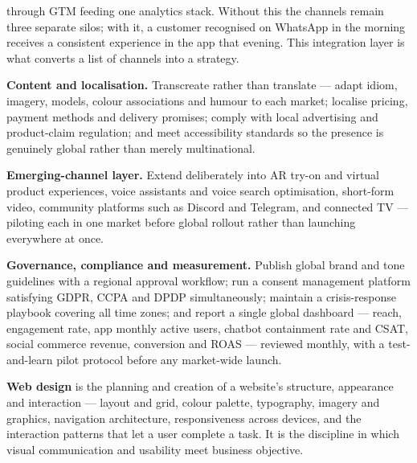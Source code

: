 \begin{qlist}
\begin{apts}
      through GTM feeding one analytics stack. Without this the channels remain
      three separate silos; with it, a customer recognised on WhatsApp in the
      morning receives a consistent experience in the app that evening. This
      integration layer is what converts a list of channels into a strategy.
\item \textbf{Content and localisation.} Transcreate rather than translate ---
      adapt idiom, imagery, models, colour associations and humour to each
      market; localise pricing, payment methods and delivery promises; comply
      with local advertising and product-claim regulation; and meet
      accessibility standards so the presence is genuinely global rather than
      merely multinational.
\item \textbf{Emerging-channel layer.} Extend deliberately into AR try-on and
      virtual product experiences, voice assistants and voice search
      optimisation, short-form video, community platforms such as Discord and
      Telegram, and connected TV --- piloting each in one market before global
      rollout rather than launching everywhere at once.
\item \textbf{Governance, compliance and measurement.} Publish global brand and
      tone guidelines with a regional approval workflow; run a consent
      management platform satisfying GDPR, CCPA and DPDP simultaneously;
      maintain a crisis-response playbook covering all time zones; and report a
      single global dashboard --- reach, engagement rate, app monthly active
      users, chatbot containment rate and CSAT, social commerce revenue,
      conversion and ROAS --- reviewed monthly, with a test-and-learn pilot
      protocol before any market-wide launch.
\end{apts}

\textbf{Web design} is the planning and creation of a website's structure,
appearance and interaction --- layout and grid, colour palette, typography,
imagery and graphics, navigation architecture, responsiveness across devices,
and the interaction patterns that let a user complete a task. It is the
discipline in which visual communication and usability meet business objective.


\end{qlist}
